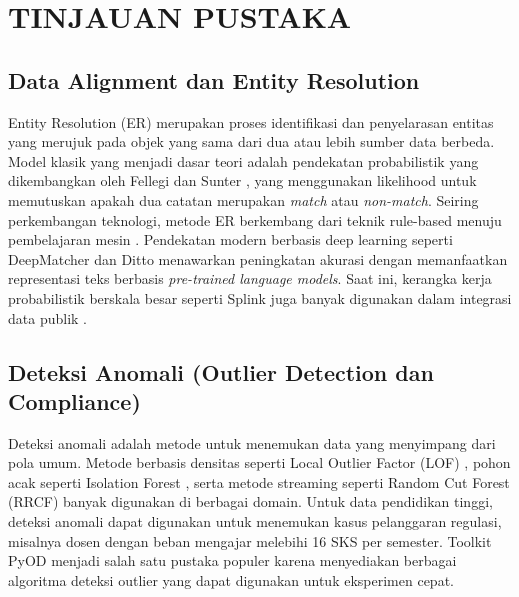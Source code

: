 \documentclass[12pt,a4paper,oneside]{report}
\begin{document}
    \chapter{TINJAUAN PUSTAKA}
    \thispagestyle{empty} %
    \section{Data Alignment dan Entity Resolution}

        Entity Resolution (ER) merupakan proses identifikasi dan penyelarasan entitas yang merujuk pada objek yang sama dari dua atau lebih sumber data berbeda. Model klasik yang menjadi dasar teori adalah pendekatan probabilistik yang dikembangkan oleh Fellegi dan Sunter \cite{fellegi1969record}, yang menggunakan likelihood untuk memutuskan apakah dua catatan merupakan \textit{match} atau \textit{non-match}.  
        Seiring perkembangan teknologi, metode ER berkembang dari teknik rule-based menuju pembelajaran mesin \cite{christen2012data}. Pendekatan modern berbasis deep learning seperti DeepMatcher \cite{mudgal2018deepmatcher} dan Ditto \cite{li2020ditto} menawarkan peningkatan akurasi dengan memanfaatkan representasi teks berbasis \textit{pre-trained language models}. Saat ini, kerangka kerja probabilistik berskala besar seperti Splink juga banyak digunakan dalam integrasi data publik \cite{splink2022}.

    \section{Deteksi Anomali (Outlier Detection dan Compliance)}
        Deteksi anomali adalah metode untuk menemukan data yang menyimpang dari pola umum. Metode berbasis densitas seperti Local Outlier Factor (LOF) \cite{breunig2000lof}, pohon acak seperti Isolation Forest \cite{liu2008iforest}, serta metode streaming seperti Random Cut Forest (RRCF) \cite{guha2016rrcf} banyak digunakan di berbagai domain.  
        Untuk data pendidikan tinggi, deteksi anomali dapat digunakan untuk menemukan kasus pelanggaran regulasi, misalnya dosen dengan beban mengajar melebihi 16 SKS per semester. Toolkit PyOD\cite{zhao2019pyod} menjadi salah satu pustaka populer karena menyediakan berbagai algoritma deteksi outlier yang dapat digunakan untuk eksperimen cepat.  
\end{document}
